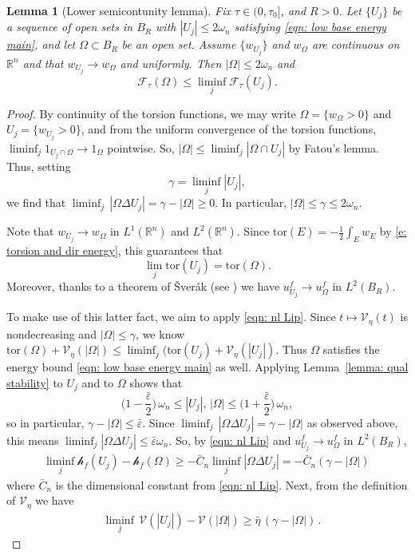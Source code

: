 \documentclass[10pt, reqno]{amsart}
\numberwithin{equation}{section}
\newtheorem{lemma}[theorem]{Lemma}
\def\R{{\mathbb R}}
\def\e{\varepsilon}
\def\W{\Omega}
\def\om{\omega}
\def\tor{\mathrm{tor}}
\def\vpar{\eta}
\def\fv{\mathscr{V}_{\vpar}}
\def\vo{\mathscr{V}}
\def\err{\tau}
\def\Ep{\mathcal{F}_{\err}}
\def\nl{\mathscr{h}_f}
\def\baryEps{\bar{\e}}
\begin{document}
 \begin{lemma}[Lower semicontunity lemma]
 \label{lem: LSC lemma}
   Fix  $\tau \in (0, \tau_0]$, and $R>0$. Let $\{U_j\}$ be a sequence of open sets in $B_R$ with $|U_j| \leq 2 \om_n$ satisfying \eqref{eqn: low base energy main}, and let  $\W \subset B_R$ be an open set. 
     Assume $\{ w_{U_j}\}$ and $w_\W$ are continuous on $\R^n$ and that $w_{U_j} \to  w_\W$ and uniformly. Then $|\W| \leq 2\om_n$ and 
     \begin{equation}\label{eqn: lower semicontinuity}
         \Ep(\W) \leq \liminf_j \Ep(U_j).
     \end{equation}
 \end{lemma}
 \begin{proof}
By continuity of the torsion functions, we may write $\W = \{w_\W >0\}$ and $U_j = \{ w_{U_j} >0\}$, and from the uniform convergence of the torsion functions, $ \liminf_j 1_{U_j\cap \W} \to  1_\W$ pointwise. So, $|\W| \leq \liminf_j |\W\cap U_j|$ by Fatou's lemma. Thus, setting 
\[
\gamma = \liminf_j |U_j|,
\]
we find that $ \liminf_j  \, |\W\Delta U_j |   = \gamma - |\W|\geq 0$. In particular, $|\W| \leq \gamma \leq    2 \om_n$.

Note that $w_{U_j} \to w_\W$ in $L^1(\R^n)$ and $L^2(\R^n)$. Since  $\tor(E) = -\frac{1}{2}\int_E w_E$ by \eqref{e: torsion and dir energy}, this guarantees that
 \begin{equation}
     \label{eqn: existence torsion continuity} \lim_{j}\tor(U_j) = \tor(\W).
 \end{equation}
Moreover, thanks to a theorem of \v{S}ver\'{a}k (see \cite[Theorem 3.2.5]{hp18}) we have  $ u_{U_j}^f \to u_{\W}^f$ in $L^2(B_R)$. 

To make use of this latter fact, we aim to apply \eqref{eqn: nl Lip}.
Since $t\mapsto \fv(t)$ is nondecreasing and $|\W| \leq \gamma$, we know $\tor(\W) + \fv(|\W|) \leq \liminf_j (\tor(U_j) + \fv(|U_j|)$. Thus
$\W$ satisfies the energy bound \eqref{eqn: low base energy main} as well.
Applying Lemma~\ref{lemma: qual stability} to $U_j$ and to $\W$ shows that 
$$
\Big(1-\frac{\baryEps}{2}\Big)\, \om_n \leq |U_j|, \, |\W| \leq \Big(1+\frac{\baryEps}{2}\Big)\, \omega_n,
$$
so in particular, $\gamma - |\W| \leq \baryEps.$ Since $ \liminf_j  \, |\W\Delta U_j |   = \gamma - |\W|$ as observed above, this means
  $\liminf_j |\W\Delta U_j |  \leq \baryEps\om_n.$ 
  So, by \eqref{eqn: nl Lip} and $ u_{U_j}^f \to u_{\W}^f$ in $L^2(B_R)$,
 	\begin{align} \label{eqn: existence quant non LSC nl}
 	\liminf_j \nl(U_j) - \nl(\W)  \geq   -\bar{C}_n\liminf_j|\W\Delta U_j| = -\bar{C}_n(\gamma - |\W|) \,
 	\end{align}
where $\bar{C}_n$ is the dimensional constant from \eqref{eqn: nl Lip}.
Next, from the definition of $\fv$ we have
\begin{align}
 \label{eqn: existence V term quant  LSC}
&  \liminf_j\, \vo(|U_j|) - \vo(|\W|)  \geq {\bar\eta}\, (\gamma - |\W|)\,.
 \end{align}



\end{proof}
\end{document}
